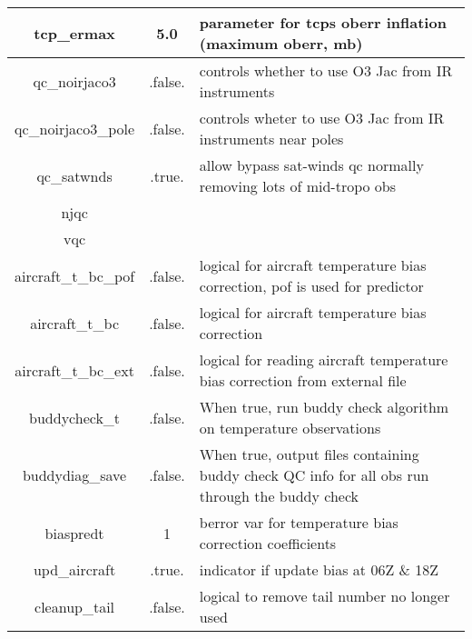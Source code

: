 \begin{table}[h]
\begin{tabular}{| c | c | p{9cm} |}
  \hline
  tcp\_ermax & 5.0 & parameter for tcps oberr inflation (maximum oberr, mb) \\
  \hline
  qc\_noirjaco3 & .false. & controls whether to use O3 Jac from IR instruments \\
  \hline
  qc\_noirjaco3\_pole & .false.	& controls wheter to use O3 Jac from IR instruments near poles \\
  \hline
  qc\_satwnds & .true. & allow bypass sat-winds qc normally removing lots of mid-tropo obs \\
  \hline
  njqc & & \\
  \hline
  vqc & & \\
  \hline
  aircraft\_t\_bc\_pof & .false. & logical for aircraft temperature bias correction, pof is used for predictor \\
  \hline
  aircraft\_t\_bc & .false. & logical for aircraft temperature bias correction \\
  \hline
  aircraft\_t\_bc\_ext & .false. & logical for reading aircraft temperature bias correction from external file \\
  \hline
  buddycheck\_t & .false. & When true, run buddy check algorithm on temperature observations \\
  \hline
  buddydiag\_save & .false. & When true, output files containing buddy check QC info for all obs run through the buddy check \\
  \hline
  biaspredt & 1 & berror var for temperature bias correction coefficients \\
  \hline
  upd\_aircraft & .true. & indicator if update bias at 06Z \& 18Z \\
  \hline
  cleanup\_tail & .false. & logical to remove tail number no longer used \\
  \hline
 \end{tabular}
\end{table}

